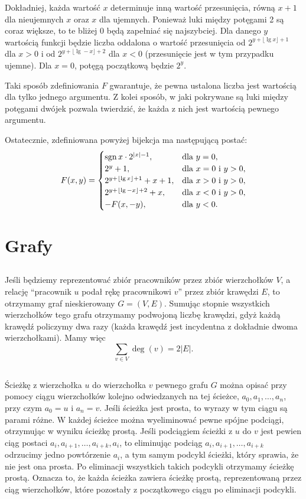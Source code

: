 Dokładniej, każda wartość $x$ determinuje inną wartość przesunięcia, równą $x+1$ dla nieujemnych $x$ oraz $x$ dla ujemnych. Ponieważ luki między potęgami 2 są coraz większe, to te bliżej 0 będą zapełniać się najszybciej. Dla danego $y$ wartością funkcji będzie liczba oddalona o wartość przesunięcia od $2^{y+\lfloor\lg x\rfloor+1}$ dla $x>0$ i od $2^{y+\lfloor\lg-x\rfloor+2}$ dla $x<0$ (przesunięcie jest w tym przypadku ujemne). Dla $x=0$, potęgą początkową będzie $2^y$.

Taki sposób zdefiniowania $F$ gwarantuje, że pewna ustalona liczba jest wartością dla tylko jednego argumentu. Z kolei sposób, w jaki pokrywane są luki między potęgami dwójek pozwala twierdzić, że każda z nich jest wartością pewnego argumentu.

Ostatecznie, zdefiniowana powyżej bijekcja ma następującą postać:
\[
	F(x,y) =
	\begin{cases}
		\operatorname{sgn} x\cdot2^{|x|-1}, & \text{dla $y=0$}, \\
		2^y+1, & \text{dla $x=0$ i $y>0$}, \\
		2^{y+\lfloor\lg x\rfloor+1}+x+1, & \text{dla $x>0$ i $y>0$}, \\
		2^{y+\lfloor\lg-x\rfloor+2}+x, & \text{dla $x<0$ i $y>0$}, \\
		-F(x,-y), & \text{dla $y<0$}.
	\end{cases}
\]

\section{Grafy}

\subsection{} %
Jeśli będziemy reprezentować zbiór pracowników przez zbiór wierzchołków $V$, a relację ``pracownik $u$ podał rękę pracownikowi $v$'' przez zbiór krawędzi $E$, to otrzymamy graf nieskierowany $G=(V,E)$. Sumując stopnie wszystkich wierzchołków tego grafu otrzymamy podwojoną liczbę krawędzi, gdyż każdą krawędź policzymy dwa razy (każda krawędź jest incydentna z dokładnie dwoma wierzchołkami). Mamy więc
\[
	\sum_{v\in V}\deg(v)=2|E|.
\]

\subsection{} %
Ścieżkę z wierzchołka $u$ do wierzchołka $v$ pewnego grafu $G$ można opisać przy pomocy ciągu wierzchołków kolejno odwiedzanych na tej ścieżce, $a_0,a_1,\dots,a_n$, przy czym $a_0=u$ i $a_n=v$. Jeśli ścieżka jest prosta, to wyrazy w tym ciągu są parami różne. W każdej ścieżce można wyeliminować pewne spójne podciągi, otrzymując w wyniku ścieżkę prostą. Jeśli podciągiem ścieżki z $u$ do $v$ jest pewien ciąg postaci $a_i,a_{i+1},\dots,a_{i+k},a_i$, to eliminując podciąg $a_i,a_{i+1},\dots,a_{i+k}$ odrzucimy jedno powtórzenie $a_i$, a tym samym podcykl ścieżki, który sprawia, że nie jest ona prosta. Po eliminacji wszystkich takich podcykli otrzymamy ścieżkę prostą. Oznacza to, że każda ścieżka zawiera ścieżkę prostą, reprezentowaną przez ciąg wierzchołków, które pozostały z początkowego ciągu po eliminacji podcykli.

